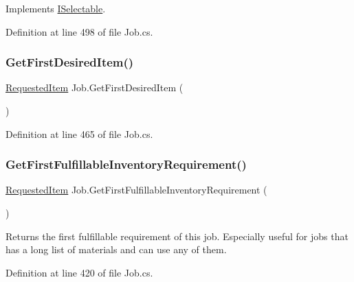 Implements \hyperlink{interface_i_selectable_a1d8947a443b6214cff01f2d75c8bc75a}{I\+Selectable}.



Definition at line 498 of file Job.\+cs.

\mbox{\label{class_job_a8dde17edcf1f5d45a8ead9c663d02ad2}} 
\subsubsection{\texorpdfstring{Get\+First\+Desired\+Item()}{GetFirstDesiredItem()}}
{\footnotesize\ttfamily \hyperlink{class_project_porcupine_1_1_jobs_1_1_requested_item}{Requested\+Item} Job.\+Get\+First\+Desired\+Item (\begin{DoxyParamCaption}{ }\end{DoxyParamCaption})}



Definition at line 465 of file Job.\+cs.

\mbox{\label{class_job_a0c3b5631b1791f188927ba33186d3446}} 
\subsubsection{\texorpdfstring{Get\+First\+Fulfillable\+Inventory\+Requirement()}{GetFirstFulfillableInventoryRequirement()}}
{\footnotesize\ttfamily \hyperlink{class_project_porcupine_1_1_jobs_1_1_requested_item}{Requested\+Item} Job.\+Get\+First\+Fulfillable\+Inventory\+Requirement (\begin{DoxyParamCaption}{ }\end{DoxyParamCaption})}



Returns the first fulfillable requirement of this job. Especially useful for jobs that has a long list of materials and can use any of them. 



Definition at line 420 of file Job.\+cs.

\mbox{\label{class_job_adc2a081cf8637f97602878516118facb}} 
